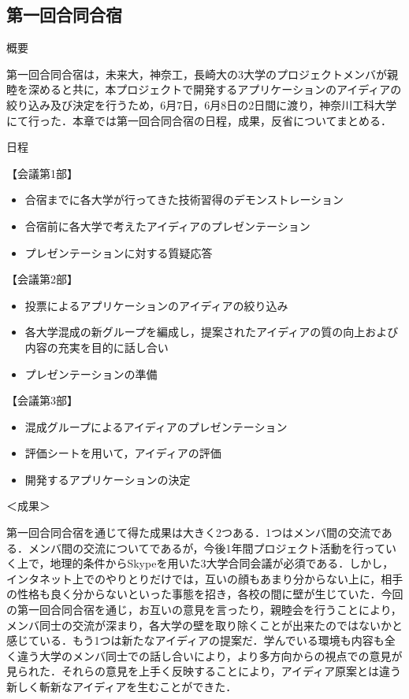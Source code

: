 \subsection{第一回合同合宿}
\par
概要
\par 
第一回合同合宿は，未来大，神奈工，長崎大の3大学のプロジェクトメンバが親睦を深めると共に，本プロジェクトで開発するアプリケーションのアイディアの絞り込み及び決定を行うため，6月7日，6月8日の2日間に渡り，神奈川工科大学にて行った．本章では第一回合同合宿の日程，成果，反省についてまとめる．
\par
日程
\par
【会議第1部】
\begin{itemize}
\item 合宿までに各大学が行ってきた技術習得のデモンストレーション
\item 合宿前に各大学で考えたアイディアのプレゼンテーション
\item プレゼンテーションに対する質疑応答
\end{itemize}
【会議第2部】
\begin{itemize}
\item 投票によるアプリケーションのアイディアの絞り込み
\item 各大学混成の新グループを編成し，提案されたアイディアの質の向上および内容の充実を目的に話し合い
\item プレゼンテーションの準備
\end{itemize}
【会議第3部】
\begin{itemize}
\item 混成グループによるアイディアのプレゼンテーション
\item 評価シートを用いて，アイディアの評価
\item 開発するアプリケーションの決定
\end{itemize}
＜成果＞
\par  第一回合同合宿を通じて得た成果は大きく2つある．1つはメンバ間の交流である．メンバ間の交流についてであるが，今後1年間プロジェクト活動を行っていく上で，地理的条件からSkypeを用いた3大学合同会議が必須である．しかし，インタネット上でのやりとりだけでは，互いの顔もあまり分からない上に，相手の性格も良く分からないといった事態を招き，各校の間に壁が生じていた．今回の第一回合同合宿を通じ，お互いの意見を言ったり，親睦会を行うことにより，メンバ同士の交流が深まり，各大学の壁を取り除くことが出来たのではないかと感じている．もう1つは新たなアイディアの提案だ．学んでいる環境も内容も全く違う大学のメンバ同士での話し合いにより，より多方向からの視点での意見が見られた．それらの意見を上手く反映することにより，アイディア原案とは違う新しく斬新なアイディアを生むことができた．
